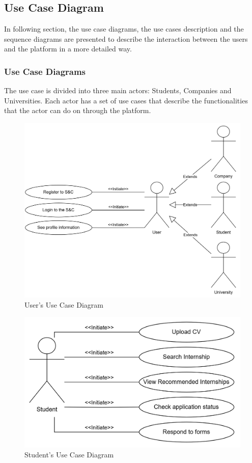 \subsection{Use Case Diagram}
In following section, the use case diagrams, the use cases description and the sequence diagrams are presented to describe 
the interaction between the users and the platform in a more detailed way.

\subsubsection{Use Case Diagrams}
The use case is divided into three main actors: Students, Companies and Universities. Each actor has a set of use cases that
describe the functionalities that the actor can do on through the platform.
\begin{figure}[H]
    \centering
    \includegraphics[width=1\textwidth]{Images/User_diagram.png}
    \caption{User's Use Case Diagram}
\end{figure}
\begin{figure}[H]
    \centering
    \includegraphics[width=1\textwidth]{Images/Student_diagram.png}
    \caption{Student's Use Case Diagram}
\end{figure}
